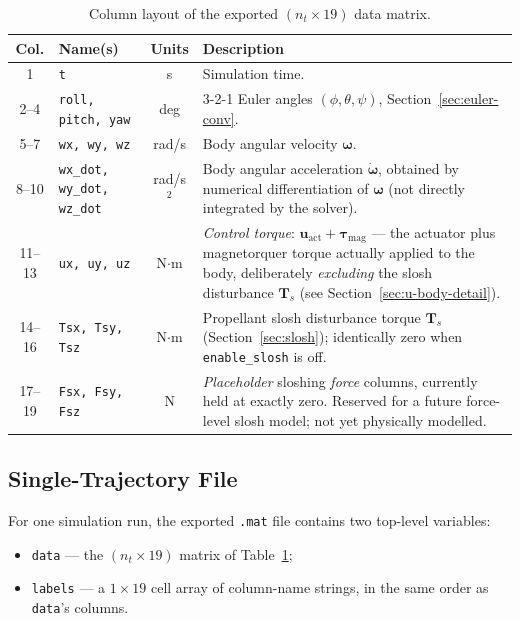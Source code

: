 \begin{table}[h]
\centering
\caption{Column layout of the exported $(n_t\times 19)$ data matrix.}
\label{tab:matlab-columns}
\begin{tabular}{@{}clcp{6.4cm}@{}}
\toprule
\textbf{Col.} & \textbf{Name(s)} & \textbf{Units} & \textbf{Description} \\
\midrule
1     & \texttt{t} & s & Simulation time. \\
2--4  & \texttt{roll, pitch, yaw} & deg &
        3-2-1 Euler angles $(\phi,\theta,\psi)$, Section~\ref{sec:euler-conv}. \\
5--7  & \texttt{wx, wy, wz} & rad/s &
        Body angular velocity $\bm{\omega}$. \\
8--10 & \texttt{wx\_dot, wy\_dot, wz\_dot} & rad/s$^2$ &
        Body angular acceleration $\dot{\bm{\omega}}$, obtained by
        numerical differentiation of $\bm{\omega}$ (not directly
        integrated by the solver). \\
11--13 & \texttt{ux, uy, uz} & N$\cdot$m &
        \emph{Control torque}: $\bm{u}_{\text{act}}+\bm{\tau}_{\text{mag}}$
        --- the actuator plus magnetorquer torque actually applied to the
        body, deliberately \emph{excluding} the slosh disturbance
        $\bm{T}_{\!s}$ (see Section~\ref{sec:u-body-detail}). \\
14--16 & \texttt{Tsx, Tsy, Tsz} & N$\cdot$m &
        Propellant slosh disturbance torque $\bm{T}_{\!s}$
        (Section~\ref{sec:slosh}); identically zero when
        \texttt{enable\_slosh} is off. \\
17--19 & \texttt{Fsx, Fsy, Fsz} & N &
        \emph{Placeholder} sloshing \emph{force} columns, currently held
        at exactly zero. Reserved for a future force-level slosh model;
        not yet physically modelled. \\
\bottomrule
\end{tabular}
\end{table}

\subsection{Single-Trajectory File}
\label{sec:matlab-single}

For one simulation run, the exported \texttt{.mat} file contains two
top-level variables:
\begin{itemize}\setlength{\itemsep}{2pt}
  \item \texttt{data} --- the $(n_t\times 19)$ matrix of
        Table~\ref{tab:matlab-columns};
  \item \texttt{labels} --- a $1\times 19$ cell array of column-name
        strings, in the same order as \texttt{data}'s columns.
\end{itemize}

